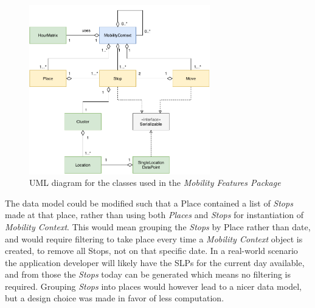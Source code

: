 \begin{figure}[h]
    \centering
    \includegraphics[width=0.7\textwidth]{./images/uml-mobility.pdf}
    \caption{UML diagram for the classes used in the \textit{Mobility Features Package}}
    \label{fig:my_label}
\end{figure}

The data model could be modified such that a Place contained a list of \textit{Stops} made at that place, rather than using both \textit{Places} and \textit{Stops} for instantiation of \textit{Mobility Context}. This would mean grouping the \textit{Stops} by Place rather than date, and would require filtering to take place every time a \textit{Mobility Context} object is created, to remove all Stops, not on that specific date. In a real-world scenario the application developer will likely have the SLPs for the current day available, and from those the \textit{Stops} today can be generated which means no filtering is required. Grouping \textit{Stops} into places would however lead to a nicer data model, but a design choice was made in favor of less computation. 


